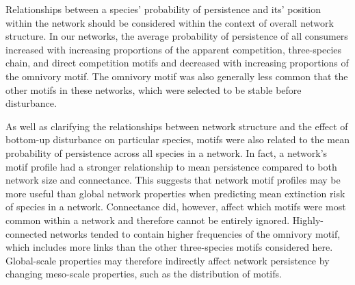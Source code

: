 \documentclass[12pt]{article}
\begin{document}
\begin{spacing}{2.0}
    
    
    
    
    
    Relationships between a species' probability of persistence and its' position within the network should be considered within the context of overall network structure.
    In our networks, the average probability of persistence of all consumers increased with increasing proportions of the apparent competition, three-species chain, and direct competition motifs and decreased with increasing proportions of the omnivory motif.
    The omnivory motif was also generally less common that the other motifs in these networks, which were selected to be stable before disturbance. 
    
    As well as clarifying the relationships between network structure and the effect of bottom-up disturbance on particular species, motifs were also related to the mean probability of persistence across all species in a network.
    In fact, a network's motif profile had a stronger relationship to mean persistence compared to both network size and connectance. 
    This suggests that network motif profiles may be more useful than global network properties when predicting mean extinction risk of species in a network.
    Connectance did, however, affect which motifs were most common within a network and therefore cannot be entirely ignored. 
    Highly-connected networks tended to contain higher frequencies of the omnivory motif, which includes more links than the other three-species motifs considered here.
    Global-scale properties may therefore indirectly affect network persistence by changing meso-scale properties, such as the distribution of motifs. 
    

\end{spacing}
\end{document}
